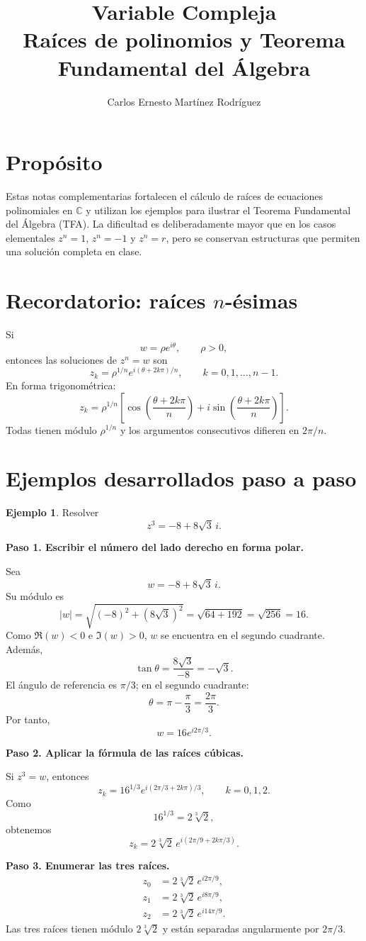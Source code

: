 \documentclass[12pt]{article}
\title{\textbf{Variable Compleja}\\[0.2cm]\Large Raíces de polinomios y Teorema Fundamental del Álgebra}
\author{Carlos Ernesto Martínez Rodríguez}
\date{}
\theoremstyle{definition}
\newtheorem{ejemplo}{Ejemplo}[section]
\theoremstyle{remark}
\newcommand{\C}{\mathbb{C}}
\begin{document}
\maketitle
\tableofcontents
\newpage

\section{Propósito}
Estas notas complementarias fortalecen el cálculo de raíces de ecuaciones
polinomiales en $\C$ y utilizan los ejemplos para ilustrar el Teorema
Fundamental del Álgebra (TFA). La dificultad es deliberadamente mayor que en
los casos elementales $z^n=1$, $z^n=-1$ y $z^n=r$, pero se conservan
estructuras que permiten una solución completa en clase.

\section{Recordatorio: raíces $n$-ésimas}
Si
\[
w=\rho e^{i\theta},\qquad \rho>0,
\]
entonces las soluciones de $z^n=w$ son
\[
\boxed{z_k=\rho^{1/n}e^{i(\theta+2k\pi)/n}},
\qquad k=0,1,\ldots,n-1.
\]
En forma trigonométrica:
\[
z_k=\rho^{1/n}\left[
\cos\left(\frac{\theta+2k\pi}{n}\right)
+i\sin\left(\frac{\theta+2k\pi}{n}\right)\right].
\]
Todas tienen módulo $\rho^{1/n}$ y los argumentos consecutivos difieren en
$2\pi/n$.


\section{Ejemplos desarrollados paso a paso}

\begin{ejemplo}
Resolver
\[
z^3=-8+8\sqrt3\,i.
\]

\textbf{Paso 1. Escribir el número del lado derecho en forma polar.}

Sea
\[
w=-8+8\sqrt3\,i.
\]
Su módulo es
\[
|w|=\sqrt{(-8)^2+(8\sqrt3)^2}
=\sqrt{64+192}
=\sqrt{256}=16.
\]
Como $\Re(w)<0$ e $\Im(w)>0$, $w$ se encuentra en el segundo cuadrante.
Además,
\[
\tan\theta=\frac{8\sqrt3}{-8}=-\sqrt3.
\]
El ángulo de referencia es $\pi/3$; en el segundo cuadrante:
\[
\theta=\pi-\frac{\pi}{3}=\frac{2\pi}{3}.
\]
Por tanto,
\[
w=16e^{i2\pi/3}.
\]

\textbf{Paso 2. Aplicar la fórmula de las raíces cúbicas.}

Si $z^3=w$, entonces
\[
z_k=16^{1/3}
e^{i(2\pi/3+2k\pi)/3},
\qquad k=0,1,2.
\]
Como
\[
16^{1/3}=2\sqrt[3]{2},
\]
obtenemos
\[
z_k=2\sqrt[3]{2}\,
e^{i(2\pi/9+2k\pi/3)}.
\]

\textbf{Paso 3. Enumerar las tres raíces.}
\[
\boxed{
\begin{aligned}
z_0&=2\sqrt[3]{2}\,e^{i2\pi/9},\\
z_1&=2\sqrt[3]{2}\,e^{i8\pi/9},\\
z_2&=2\sqrt[3]{2}\,e^{i14\pi/9}.
\end{aligned}}
\]
Las tres raíces tienen módulo $2\sqrt[3]{2}$ y están separadas angularmente por
$2\pi/3$.
\end{ejemplo}
\end{document}
